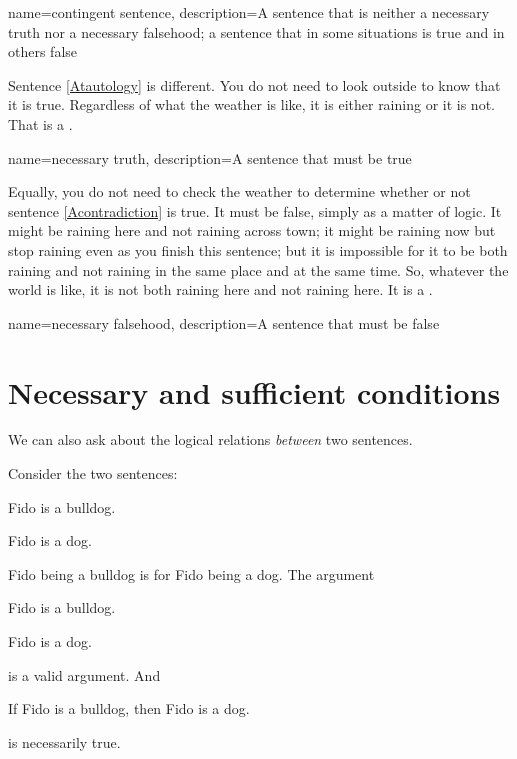 {
name=contingent sentence,
description={A sentence that is neither a \gls{necessary truth} nor a \gls{necessary falsehood}; a sentence that in some situations is true and in others false}
}

Sentence \ref{Atautology} is different. You do not need to look outside to know that it is true. Regardless of what the weather is like, it is either raining or it is not. That is a . 

{
name={necessary truth},
description={A sentence that must be true}
}

Equally, you do not need to check the weather to determine whether or not sentence \ref{Acontradiction} is true. It must be false, simply as a matter of logic. It might be raining here and not raining across town; it might be raining now but stop raining even as you finish this sentence; but it is impossible for it to be both raining and not raining in the same place and at the same time. So, whatever the world is like, it is not both raining here and not raining here. It is a .

{
name={necessary falsehood},
description={A sentence that must be false}
}



\section{Necessary and sufficient conditions}
We can also ask about the logical relations \emph{between} two sentences. 

Consider the two sentences:
\begin{earg}
\item Fido is a bulldog.
\item Fido is a dog.
\end{earg}
Fido being a bulldog is  for Fido being a dog.
The argument 
\begin{earg}
\item Fido is a bulldog.
\item[\therefore] Fido is a dog.
\end{earg} is a valid argument. And 
\begin{earg}
\item[] If Fido is a bulldog, then Fido is a dog.
\end{earg}is necessarily true.

